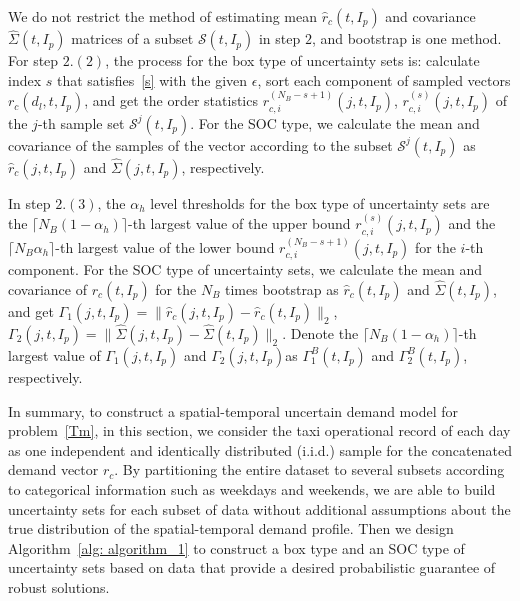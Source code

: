 \documentclass[10pt,twocolumn,twoside,english]{IEEEtran}
\begin{document}
We do not restrict the method of estimating  mean $\hat{r}_c(t,I_p)$ and covariance $\hat{\Sigma}(t,I_p)$ matrices of a subset $\mathcal{S}(t, I_p)$ in step $2$,  and bootstrap is one method. For step $2.(2)$, the process for the box type of uncertainty sets is: calculate index $s$ that satisfies~\eqref{s} with the given $\epsilon$, sort each component of sampled vectors $r_c(d_l, t, I_p)$, and get the order statistics $r_{c,i}^{(N_B-s+1)}(j,t, I_p)$, $r_{c,i}^{(s)}(j,t,I_p)$ of the $j$-th sample set $\mathcal{S}^j(t, I_p)$. For the SOC type, we calculate the mean and covariance of the samples of the vector according to the subset $\mathcal{S}^j(t,I_p)$ as $\hat{r}_c (j,t,I_p)$ and $\hat{\Sigma}(j,t,I_p)$, respectively.

In step $2.(3)$, the $\alpha_h$ level thresholds for the box type of uncertainty sets are the $\lceil N_B(1-\alpha_h)\rceil$-th largest value of the upper bound $r_{c,i}^{(s)}(j,t,I_p)$ and the $\lceil N_B \alpha_h \rceil$-th largest value of the lower bound $r_{c,i}^{(N_B-s+1)}(j,t,I_p)$ for the $i$-th component. For the SOC type of uncertainty sets, we calculate the mean and covariance of $r_c(t, I_p)$ for the $N_B$ times bootstrap as $\hat{r}_c(t,I_p)$ and $\hat{\Sigma}(t,I_p)$, and get $\Gamma_1(j,t,I_p)=\|\hat{r}_c(j,t,I_p)-\hat{r}_c(t,I_p)\|_2$, $\Gamma_2(j,t,I_p)=\|\hat{\Sigma}(j,t,I_p)-\hat{\Sigma}(t,I_p)\|_2.$ Denote the $\lceil N_B(1-\alpha_h)\rceil$-th largest value of $\Gamma_1(j,t,I_p)$ and $\Gamma_2(j,t,I_p)$as $\Gamma_1^B (t,I_p)$ and $\Gamma_2^B(t,I_p)$, respectively. 

In summary, to construct a spatial-temporal uncertain demand model for problem~\eqref{Tm}, in this section, we consider the taxi operational record of each day as one independent and identically distributed (i.i.d.) sample for the concatenated demand vector $r_c$. By partitioning the entire dataset to several subsets according to categorical information such as weekdays and weekends, we are able to build uncertainty sets for each subset of data without additional assumptions about the true distribution of the spatial-temporal demand profile. Then we design Algorithm~\ref{alg: algorithm_1} to construct a box type and an SOC type of uncertainty sets based on data that provide a desired probabilistic guarantee of robust solutions.
\end{document}

